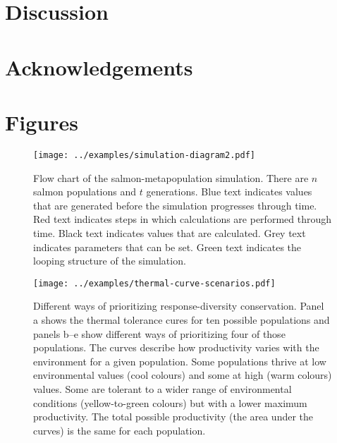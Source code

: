 \section{Discussion}

\section{Acknowledgements}





\clearpage

\section{Figures}

\clearpage

\begin{figure}[htbp]
\centering
\texttt{[image: ../examples/simulation-diagram2.pdf]}
\caption{Flow chart of the salmon-metapopulation simulation. There are $n$ salmon populations and $t$ generations. Blue text indicates values that are generated before the simulation progresses through time. Red text indicates steps in which calculations are performed through time. Black text indicates values that are calculated. Grey text indicates parameters that can be set. Green text indicates the looping structure of the simulation.}
\label{f:sim-flow}
\end{figure}

\clearpage

\begin{figure}[htbp]
\centering
\texttt{[image: ../examples/thermal-curve-scenarios.pdf]}
\caption{Different ways of prioritizing response-diversity conservation. Panel a shows the thermal tolerance cures for ten possible populations and panels b--e show different ways of prioritizing four of those populations. The curves describe how productivity varies with the environment for a given population. Some populations thrive at low environmental values (cool colours) and some at high (warm colours) values. Some are tolerant to a wider range of environmental conditions (yellow-to-green colours) but with a lower maximum productivity. The total possible productivity (the area under the curves) is the same for each population.}
\label{f:curves}
\end{figure}

\clearpage

